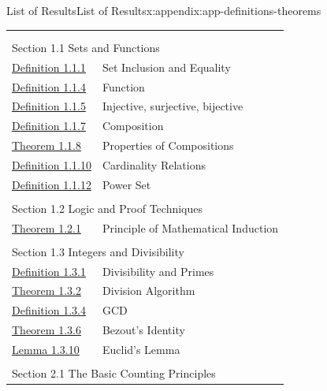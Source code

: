 \documentclass[oneside,10pt,]{book}
\numberwithin{equation}{section}
\begin{document}
\begin{appendixptx}{List of Results}{}{List of Results}{}{}{x:appendix:app-definitions-theorems}
\noindent
\begin{longtable}[l]{ll}
\addtocounter{table}{-1}
\endfirsthead
\endhead
\multicolumn{2}{r}{(Continued on next page)}\\
\endfoot
\endlastfoot
\multicolumn{2}{l}{\null}\\[1.5ex] \multicolumn{2}{l}{\large Section 1.1 Sets and Functions}\\[0.5ex]
\hyperref[x:definition:def-set-inclusion-equality]{Definition 1.1.1}& Set Inclusion and Equality\\
\hyperref[x:definition:def-function]{Definition 1.1.4}& Function\\
\hyperref[x:definition:def-injective]{Definition 1.1.5}& Injective, surjective, bijective\\
\hyperref[x:definition:def-composition]{Definition 1.1.7}& Composition\\
\hyperref[x:theorem:thm-composition-of-bijections]{Theorem 1.1.8}& Properties of Compositions\\
\hyperref[x:definition:def-cardinality]{Definition 1.1.10}& Cardinality Relations\\
\hyperref[x:definition:def-power-set]{Definition 1.1.12}& Power Set\\
\multicolumn{2}{l}{\null}\\[1.5ex] \multicolumn{2}{l}{\large Section 1.2 Logic and Proof Techniques}\\[0.5ex]
\hyperref[x:theorem:thm-induction]{Theorem 1.2.1}& Principle of Mathematical Induction\\
\multicolumn{2}{l}{\null}\\[1.5ex] \multicolumn{2}{l}{\large Section 1.3 Integers and Divisibility}\\[0.5ex]
\hyperref[x:definition:def-divisibility]{Definition 1.3.1}& Divisibility and Primes\\
\hyperref[x:theorem:thm-division-algorithm]{Theorem 1.3.2}& Division Algorithm\\
\hyperref[x:definition:def-gcd]{Definition 1.3.4}& GCD\\
\hyperref[x:theorem:thm-bezout]{Theorem 1.3.6}& Bezout's Identity\\
\hyperref[x:lemma:lem-euclid]{Lemma 1.3.10}& Euclid's Lemma\\
\multicolumn{2}{l}{\null}\\[1.5ex] \multicolumn{2}{l}{\large Section 2.1 The Basic Counting Principles}\\[0.5ex]

\end{longtable}
\end{appendixptx}
\end{document}
